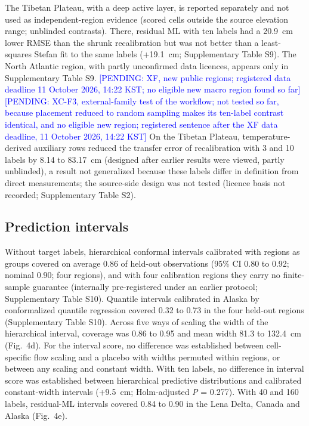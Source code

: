 The Tibetan Plateau, with a deep active layer, is reported separately and not used as independent-region evidence (scored cells outside the source elevation range; unblinded contrasts).
There, residual ML with ten labels had a 20.9~cm lower RMSE than the shrunk recalibration but was not better than a least-squares Stefan fit to the same labels (+19.1~cm; Supplementary Table S9).
The North Atlantic region, with partly unconfirmed data licences, appears only in Supplementary Table S9.
\textcolor{blue}{[PENDING: XF, new public regions; registered data deadline 11 October 2026, 14:22 KST; no eligible new macro region found so far]}
\textcolor{blue}{[PENDING: XC-F3, external-family test of the workflow; not tested so far, because placement reduced to random sampling makes its ten-label contrast identical, and no eligible new region; registered sentence after the XF data deadline, 11 October 2026, 14:22 KST]}
On the Tibetan Plateau, temperature-derived auxiliary rows reduced the transfer error of recalibration with 3 and 10 labels by 8.14 to 83.17~cm (designed after earlier results were viewed, partly unblinded), a result not generalized because these labels differ in definition from direct measurements; the source-side design was not tested (licence basis not recorded; Supplementary Table S2).

\subsection{Prediction intervals}
\label{sec:results-intervals}

Without target labels, hierarchical conformal intervals\cite{Dunn2023} calibrated with regions as groups covered on average 0.86 of held-out observations (95\% CI 0.80 to 0.92; nominal 0.90; four regions), and with four calibration regions they carry no finite-sample guarantee (internally pre-registered under an earlier protocol; Supplementary Table S10).
Quantile intervals calibrated in Alaska by conformalized quantile regression\cite{romano2019_conformalized_quantile_regression} covered 0.32 to 0.73 in the four held-out regions (Supplementary Table S10).
Across five ways of scaling the width of the hierarchical interval, coverage was 0.86 to 0.95 and mean width 81.3 to 132.4~cm (Fig.~4d).
For the interval score\cite{GneitingRaftery2007}, no difference was established between cell-specific flow scaling and a placebo with widths permuted within regions, or between any scaling and constant width.
With ten labels, no difference in interval score was established between hierarchical predictive distributions and calibrated constant-width intervals (+9.5~cm; Holm-adjusted \textit{P} = 0.277).
With 40 and 160 labels, residual-ML intervals covered 0.84 to 0.90 in the Lena Delta, Canada and Alaska (Fig.~4e).
